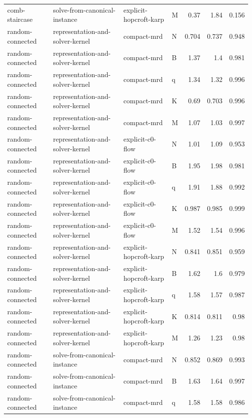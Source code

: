 \begin{table}[t]
\begin{tabular}{llllrrr}
comb-staircase & solve-from-canonical-instance & explicit-hopcroft-karp & M & 0.37 & 1.84 & 0.156 \\
random-connected & representation-and-solver-kernel & compact-mrd & N & 0.704 & 0.737 & 0.948 \\
random-connected & representation-and-solver-kernel & compact-mrd & B & 1.37 & 1.4 & 0.981 \\
random-connected & representation-and-solver-kernel & compact-mrd & q & 1.34 & 1.32 & 0.996 \\
random-connected & representation-and-solver-kernel & compact-mrd & K & 0.69 & 0.703 & 0.996 \\
random-connected & representation-and-solver-kernel & compact-mrd & M & 1.07 & 1.03 & 0.997 \\
random-connected & representation-and-solver-kernel & explicit-c0-flow & N & 1.01 & 1.09 & 0.953 \\
random-connected & representation-and-solver-kernel & explicit-c0-flow & B & 1.95 & 1.98 & 0.981 \\
random-connected & representation-and-solver-kernel & explicit-c0-flow & q & 1.91 & 1.88 & 0.992 \\
random-connected & representation-and-solver-kernel & explicit-c0-flow & K & 0.987 & 0.985 & 0.999 \\
random-connected & representation-and-solver-kernel & explicit-c0-flow & M & 1.52 & 1.54 & 0.996 \\
random-connected & representation-and-solver-kernel & explicit-hopcroft-karp & N & 0.841 & 0.851 & 0.959 \\
random-connected & representation-and-solver-kernel & explicit-hopcroft-karp & B & 1.62 & 1.6 & 0.979 \\
random-connected & representation-and-solver-kernel & explicit-hopcroft-karp & q & 1.58 & 1.57 & 0.987 \\
random-connected & representation-and-solver-kernel & explicit-hopcroft-karp & K & 0.814 & 0.811 & 0.98 \\
random-connected & representation-and-solver-kernel & explicit-hopcroft-karp & M & 1.26 & 1.23 & 0.98 \\
random-connected & solve-from-canonical-instance & compact-mrd & N & 0.852 & 0.869 & 0.993 \\
random-connected & solve-from-canonical-instance & compact-mrd & B & 1.63 & 1.64 & 0.997 \\
random-connected & solve-from-canonical-instance & compact-mrd & q & 1.58 & 1.58 & 0.986 \\

\end{tabular}
\end{table}
